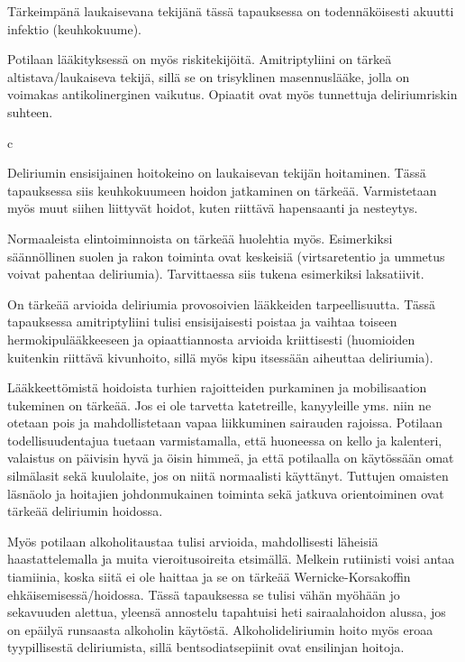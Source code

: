 \documentclass[
]{book}
\begin{document}
Tärkeimpänä laukaisevana tekijänä tässä tapauksessa on todennäköisesti akuutti infektio (keuhkokuume).

Potilaan lääkityksessä on myös riskitekijöitä. Amitriptyliini on tärkeä altistava/laukaiseva tekijä, sillä se on trisyklinen masennuslääke, jolla on voimakas antikolinerginen vaikutus. Opiaatit ovat myös tunnettuja deliriumriskin suhteen.

c

Deliriumin ensisijainen hoitokeino on laukaisevan tekijän hoitaminen. Tässä tapauksessa siis keuhkokuumeen hoidon jatkaminen on tärkeää. Varmistetaan myös muut siihen liittyvät hoidot, kuten riittävä hapensaanti ja nesteytys.

Normaaleista elintoiminnoista on tärkeää huolehtia myös. Esimerkiksi säännöllinen suolen ja rakon toiminta ovat keskeisiä (virtsaretentio ja ummetus voivat pahentaa deliriumia). Tarvittaessa siis tukena esimerkiksi laksatiivit.

On tärkeää arvioida deliriumia provosoivien lääkkeiden tarpeellisuutta. Tässä tapauksessa amitriptyliini tulisi ensisijaisesti poistaa ja vaihtaa toiseen hermokipulääkkeeseen ja opiaattiannosta arvioida kriittisesti (huomioiden kuitenkin riittävä kivunhoito, sillä myös kipu itsessään aiheuttaa deliriumia).

Lääkkeettömistä hoidoista turhien rajoitteiden purkaminen ja mobilisaation tukeminen on tärkeää. Jos ei ole tarvetta katetreille, kanyyleille yms. niin ne otetaan pois ja mahdollistetaan vapaa liikkuminen sairauden rajoissa. Potilaan todellisuudentajua tuetaan varmistamalla, että huoneessa on kello ja kalenteri, valaistus on päivisin hyvä ja öisin himmeä, ja että potilaalla on käytössään omat silmälasit sekä kuulolaite, jos on niitä normaalisti käyttänyt. Tuttujen omaisten läsnäolo ja hoitajien johdonmukainen toiminta sekä jatkuva orientoiminen ovat tärkeää deliriumin hoidossa.

Myös potilaan alkoholitaustaa tulisi arvioida, mahdollisesti läheisiä haastattelemalla ja muita vieroitusoireita etsimällä. Melkein rutiinisti voisi antaa tiamiinia, koska siitä ei ole haittaa ja se on tärkeää Wernicke-Korsakoffin ehkäisemisessä/hoidossa. Tässä tapauksessa se tulisi vähän myöhään jo sekavuuden alettua, yleensä annostelu tapahtuisi heti sairaalahoidon alussa, jos on epäilyä runsaasta alkoholin käytöstä. Alkoholideliriumin hoito myös eroaa tyypillisestä deliriumista, sillä bentsodiatsepiinit ovat ensilinjan hoitoja.
\end{document}
